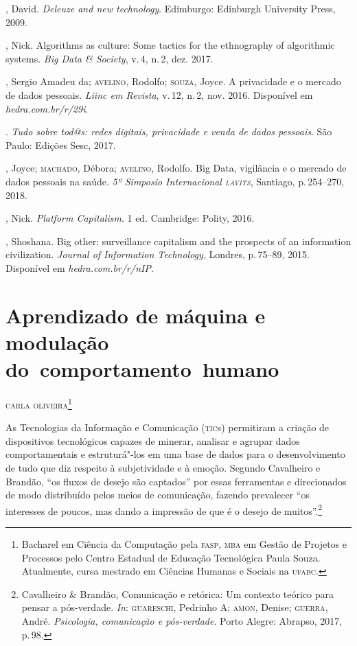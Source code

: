 \begin{bibliohedra}
, David. \textit{Deleuze and new technology}. Edimburgo: Edinburgh
University Press, 2009.

, Nick. Algorithms as culture: Some tactics for the
ethnography of algorithmic systems. \textit{Big Data \& Society}, v.\,4, n.\,2, dez. 2017.

, Sergio Amadeu da; \textsc{avelino}, Rodolfo; \textsc{souza}, Joyce. A privacidade e o mercado de dados pessoais. \textit{Liinc em Revista}, v.\,12, n.\,2, nov. 2016. Disponível em \textit{hedra.com.br/r/29i}.

\titidem. \textit{Tudo sobre tod@s: redes digitais,
privacidade e venda de dados pessoais}. São Paulo: Edições Sesc, 2017.

, Joyce; \textsc{machado}, Débora; \textsc{avelino}, Rodolfo. Big Data, vigilância e o mercado de dados pessoais na saúde. \textit{5º Simposio Internacional \textsc{lavits}}, Santiago, p.\,254--270, 2018.

, Nick. \textit{Platform Capitalism}. 1 ed. Cambridge: Polity, 2016.

, Shoshana. Big other: surveillance capitalism and the
prospects of an information civilization. \textit{Journal of
Information Technology}, Londres, p.\,75--89, 2015. Disponível em \textit{hedra.com.br/r/nIP}.
\end{bibliohedra}


\chapter{Aprendizado de máquina e modulação do~comportamento~humano}


\begin{flushright}
\textsc{carla oliveira\footnote{Bacharel em Ciência da Computação pela \textsc{fasp}, \textsc{mba} em Gestão de Projetos e Processos pelo Centro Estadual de Educação Tecnológica Paula Souza. Atualmente, cursa mestrado em Ciências Humanas e Sociais na \textsc{ufabc}.}}
\end{flushright}

\noindent{}As Tecnologias da Informação e Comunicação (\textsc{tic}s) permitiram a criação
de dispositivos tecnológicos capazes de minerar, analisar e agrupar
dados comportamentais e estruturá"-los em uma base de dados para o
desenvolvimento de tudo que diz respeito à subjetividade e à emoção.
Segundo Cavalheiro e Brandão, ``os fluxos de desejo são captados''
por essas ferramentas e direcionados de modo distribuído pelos meios de
comunicação, fazendo prevalecer ``os interesses de poucos, mas dando a
impressão de que é o desejo de muitos''.\footnote{Cavalheiro \& Brandão, Comunicação e
retórica: Um contexto teórico para pensar a pós-verdade. \textit{In}:
\textsc{guareschi}, Pedrinho A; \textsc{amon}, Denise; \textsc{guerra}, André. \textit{Psicologia, comunicação e pós-verdade}. Porto Alegre: Abrapso, 2017, p.\,98.}

